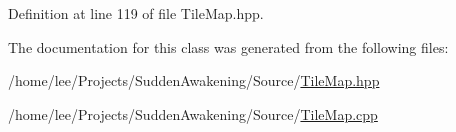 Definition at line 119 of file Tile\-Map.\-hpp.



The documentation for this class was generated from the following files\-:\begin{DoxyCompactItemize}
\item 
/home/lee/\-Projects/\-Sudden\-Awakening/\-Source/\hyperlink{_tile_map_8hpp}{Tile\-Map.\-hpp}\item 
/home/lee/\-Projects/\-Sudden\-Awakening/\-Source/\hyperlink{_tile_map_8cpp}{Tile\-Map.\-cpp}\end{DoxyCompactItemize}
